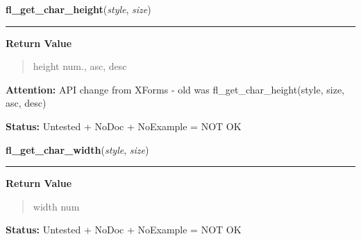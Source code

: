     \vspace{0.5ex}

\hspace{.8\funcindent}\begin{boxedminipage}{\funcwidth}

    \raggedright \textbf{fl\_get\_char\_height}(\textit{style}, \textit{size})

    \vspace{-1.5ex}

    \rule{\textwidth}{0.5\fboxrule}
\setlength{\parskip}{2ex}
\setlength{\parskip}{1ex}
      \textbf{Return Value}
    \vspace{-1ex}

      \begin{quote}
      height num., asc, desc

      \end{quote}

\textbf{Attention:} API change from XForms - old was fl\_get\_char\_height(style, size, asc, 
desc)



\textbf{Status:} Untested + NoDoc + NoExample = NOT OK



    \end{boxedminipage}

    \label{xformslib:library:fl_get_char_width}

    \vspace{0.5ex}

\hspace{.8\funcindent}\begin{boxedminipage}{\funcwidth}

    \raggedright \textbf{fl\_get\_char\_width}(\textit{style}, \textit{size})

    \vspace{-1.5ex}

    \rule{\textwidth}{0.5\fboxrule}
\setlength{\parskip}{2ex}
\setlength{\parskip}{1ex}
      \textbf{Return Value}
    \vspace{-1ex}

      \begin{quote}
      width num

      \end{quote}

\textbf{Status:} Untested + NoDoc + NoExample = NOT OK



    \end{boxedminipage}

